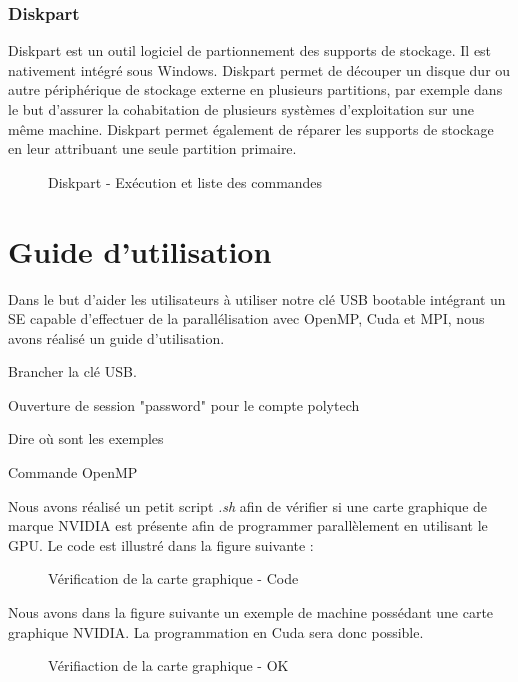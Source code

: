 \documentclass[final]{polytech/polytech}
\begin{document}
\vfill\eject

\section{Diskpart}
Diskpart est un outil logiciel de partionnement des supports de stockage. Il est nativement intégré sous Windows. Diskpart permet de découper un disque dur ou autre périphérique de stockage externe en plusieurs partitions, par exemple dans le but d'assurer la cohabitation de plusieurs systèmes d’exploitation sur une même machine. Diskpart permet également de réparer les supports de stockage en leur attribuant une seule partition primaire.

\begin{figure}
	\caption{Diskpart - Exécution et liste des commandes}
	\label{fig:diskpart}
\end{figure}

\part{Guide d'utilisation} %
Dans le but d'aider les utilisateurs à utiliser notre clé USB bootable intégrant un SE capable d'effectuer de la parallélisation avec OpenMP, Cuda et MPI, nous avons réalisé un guide d'utilisation.

Brancher la clé USB.

Ouverture de session "password" pour le compte polytech

Dire où sont les exemples

Commande OpenMP

Nous avons réalisé un petit script \textit{.sh} afin de vérifier si une carte graphique de marque NVIDIA est présente afin de programmer parallèlement en utilisant le GPU. Le code est illustré dans la figure suivante :

\begin{figure}
	\caption{Vérification de la carte graphique - Code}
	\label{fig:check_gpu_code}
\end{figure}

\vfill\eject

Nous avons dans la figure suivante un exemple de machine possédant une carte graphique NVIDIA. La programmation en Cuda sera donc possible.

\begin{figure}
	\caption{Vérifiaction de la carte graphique - OK}
	\label{fig:check_gpu_ok}
\end{figure}
\end{document}
